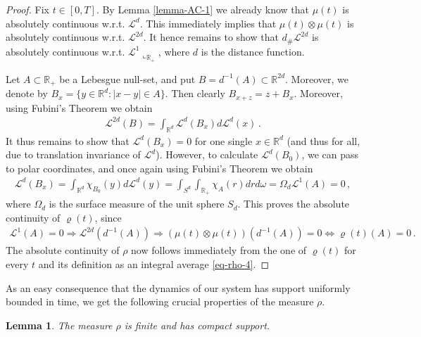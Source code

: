 \documentclass[A4paper,11pt]{article}
\newtheorem{lemma}[theorem]{Lemma}
\theoremstyle{definition}
\newcommand{\R}{\mathbb{R}}
\newcommand{\cl}{\mathcal{L}}
\begin{document}
\begin{proof}
	Fix $t\in [0,T]$. By Lemma \ref{lemma-AC-1} we already know that $\mu(t)$ is absolutely continuous w.r.t.
	$\cl^d$. This immediately implies that $\mu(t)\otimes\mu(t)$ is absolutely continuous w.r.t. $\cl^{2d}$. It hence
	remains to show that $d_{\#}\cl^{2d}$ is absolutely continuous w.r.t. $\cl^1\llcorner_{\R_+}$, where $d$ is the distance function.
	
	Let $A\subset\R_+$ be a Lebesgue null-set, and put $B=d^{-1}(A)\subset\R^{2d}$. Moreover, we denote by
	$B_x=\{y\in\R^d:|x-y|\in A\}$. Then clearly $B_{x+z}=z+B_x$. Moreover, using Fubini's Theorem we obtain
	\begin{align*}
		\cl^{2d}(B)=\int_{\R^d}\cl^d(B_x)d\cl^d(x)\,.
	\end{align*}
	It thus remains to show that $\cl^d(B_x)=0$ for one single $x\in\R^d$ (and thus for all, due to translation invariance of $\cl^d$).
	However, to calculate $\cl^d(B_0)$, we can pass to polar coordinates, and once again using Fubini's Theorem
	we obtain
	\begin{align*}
		\cl^d(B_x)=\int_{\R^d}\chi_{B_0}(y)d\cl^d(y)
			=\int_{S^d}\int_{\R_+}\chi_A(r)dr d\omega=\Omega_d\cl^1(A)=0\,,
	\end{align*}
	where $\Omega_d$ is the surface measure of the unit sphere $S_d$. This proves the absolute continuity of
	$\varrho(t)$, since
	\begin{align*}
		\cl^1(A)=0\Longrightarrow\cl^{2d}(d^{-1}(A))
			\Longrightarrow (\mu(t)\otimes\mu(t))(d^{-1}(A))=0\iff\varrho(t)(A)=0\,.
	\end{align*}
	The absolute continuity of $\rho$ now follows immediately from the one of $\varrho(t)$ for every $t$ and its
	definition as an integral average \eqref{eq-rho-4}.
\end{proof}

As an easy consequence that the dynamics of our system has support uniformly bounded in time, we get the following crucial properties of the measure $\rho$.

\begin{lemma}\label{rhocompact}
	The measure $\rho$ is finite and has compact support.
\end{lemma}
\end{document}
